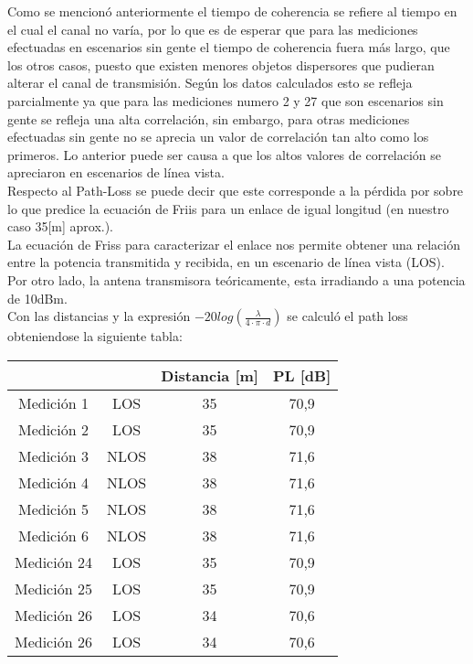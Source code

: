 \documentclass[12pt]{article}
\begin{document}
Como se mencionó anteriormente el tiempo de coherencia se refiere al tiempo en el cual 
el canal no varía, por lo que es de esperar que para las mediciones efectuadas en 
escenarios sin gente el tiempo de coherencia fuera más largo, que los otros casos, puesto 
que existen menores objetos dispersores que pudieran alterar el canal de transmisión.
Según los datos calculados esto se refleja parcialmente ya que para las mediciones numero 
2 y 27 que son escenarios sin gente se refleja una alta correlación, sin embargo, para 
otras mediciones efectuadas sin gente no se aprecia un valor de correlación tan alto como 
los primeros.  Lo anterior puede ser causa a que los altos valores de correlación se 
apreciaron en escenarios de línea vista.\\
Respecto al Path-Loss se puede decir que este corresponde a la pérdida por sobre lo que 
predice la ecuación de Friis para un enlace de igual longitud (en nuestro caso 35[m] aprox.).\\

La ecuación de Friss para caracterizar el enlace nos permite obtener una relación
entre la potencia transmitida y recibida, en un escenario de línea vista (LOS). Por otro lado, 
la antena transmisora teóricamente, esta irradiando a una potencia de 10dBm.\\
\newpage
Con las distancias y la expresión $ -20 log \left ( \frac{\lambda}{4 \cdot \pi \cdot d} \right )$
se calculó el path loss obteniendose la siguiente tabla:

\begin{center}
	\begin{tabular}{| c | c | c | c |} \hline
   &   & Distancia [m] & PL [dB] \\ \hline 
Medición 1 & LOS	& 35	& 70,9	\\ \hline
Medición 2 & LOS	& 35	& 70,9	\\ \hline
Medición 3 & NLOS	& 38	& 71,6	\\ \hline
Medición 4 & NLOS	& 38	& 71,6	\\ \hline
Medición 5 & NLOS	& 38	& 71,6	\\ \hline
Medición 6 & NLOS	& 38	& 71,6	\\ \hline
Medición 24 & LOS	& 35	& 70,9	\\ \hline
Medición 25 & LOS	& 35	& 70,9	\\ \hline
Medición 26 & LOS	& 34	& 70,6	\\ \hline
Medición 26 & LOS	& 34	& 70,6	\\ \hline
	\end{tabular}
\end{center}
\end{document}
